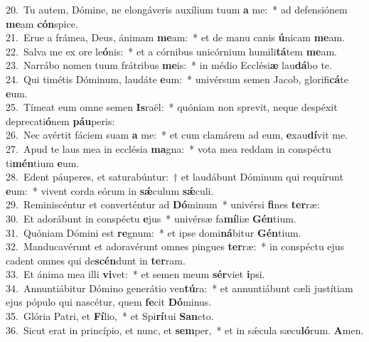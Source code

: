 {20.~}Tu autem, Dómine, ne elongáveris auxílium tuum \textbf{a} me:~* ad defensiónem \textbf{me}am \textbf{cón}spice.\\
{21.~}Erue a frámea, Deus, ánimam \textbf{me}am:~* et de manu canis \textbf{ú}nicam \textbf{me}am.\\
{22.~}Salva me ex ore le\textbf{ó}nis:~* et a córnibus unicórnium humili\textbf{tá}tem \textbf{me}am.\\
{23.~}Narrábo nomen tuum frátribus \textbf{me}is:~* in médio Ecclési\textbf{æ} lau\textbf{dá}bo te.\\
{24.~}Qui timétis Dóminum, laudáte \textbf{e}um:~* univérsum semen Jacob, glorifi\textbf{cá}te \textbf{e}um.\\
{25.~}Tímeat eum omne semen \textbf{Is}raël:~* quóniam non sprevit, neque despéxit deprecati\textbf{ó}nem \textbf{páu}peris:\\
{26.~}Nec avértit fáciem suam \textbf{a} me:~* et cum clamárem ad eum, \textbf{e}xau\textbf{dí}vit me.\\
{27.~}Apud te laus mea in ecclésia \textbf{ma}gna:~* vota mea reddam in conspéctu ti\textbf{mén}tium \textbf{e}um.\\
{28.~}Edent páuperes, et saturabúntur:~† et laudábunt Dóminum qui requírunt \textbf{e}um:~* vivent corda eórum in \textbf{sǽ}culum \textbf{sǽ}culi.\\
{29.~}Reminiscéntur et converténtur ad \textbf{Dó}minum~* univérsi \textbf{fi}nes \textbf{ter}ræ:\\
{30.~}Et adorábunt in conspéctu \textbf{e}jus~* univérsæ fa\textbf{mí}liæ \textbf{Gén}tium.\\
{31.~}Quóniam Dómini est \textbf{re}gnum:~* et ipse domi\textbf{ná}bitur \textbf{Gén}tium.\\
{32.~}Manducavérunt et adoravérunt omnes pingues \textbf{ter}ræ:~* in conspéctu ejus cadent omnes qui de\textbf{scén}dunt in \textbf{ter}ram.\\
{33.~}Et ánima mea illi \textbf{vi}vet:~* et semen meum \textbf{sér}viet \textbf{i}psi.\\
{34.~}Annuntiábitur Dómino generátio ven\textbf{tú}ra:~* et annuntiábunt cæli justítiam ejus pópulo qui nascétur, quem \textbf{fe}cit \textbf{Dó}minus.\\
{35.~}Glória Patri, et \textbf{Fí}lio,~* et Spi\textbf{rí}tui \textbf{San}cto.\\
{36.~}Sicut erat in princípio, et nunc, et \textbf{sem}per,~* et in sǽcula sæcu\textbf{ló}rum. \textbf{A}men.\\
